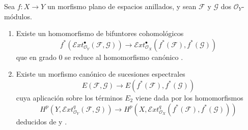 \begin{proposition}[12.3.4]
\label{0.12.3.4}
\label{0.12.3.4-fr}
Sea $f:X\to Y$ un morfismo \textup{plano} de espacios anillados, y sean
$\mathcal F$ y $\mathcal G$ dos $\mathcal O_Y$-módulos.
\begin{enumerate}
  \item[\rm(i)] Existe un homomorfismo de bifuntores cohomológicos
  \[
\label{0.12.3.4.1-fr}
\tag{12.3.4.1}
f^*(\mathcal{E}xt_{\mathcal O_Y}^{\bullet}(\mathcal F,\mathcal G))
\longrightarrow
\mathcal{E}xt_{\mathcal O_X}^{\bullet}(f^*(\mathcal F),f^*(\mathcal G))
\]
  que en grado $0$ se reduce al homomorfismo canónico
  .

  \item[\rm(ii)] Existe un morfismo canónico de sucesiones espectrales
  \[
\label{0.12.3.4.2-fr}
\tag{12.3.4.2}
E(\mathcal F,\mathcal G)\longrightarrow
E(f^*(\mathcal F),f^*(\mathcal G))
\]
  cuya aplicación sobre los términos $E_2$ viene dada por los homomorfismos
  \[
\label{0.12.3.4.3-fr}
\tag{12.3.4.3}
H^p(Y,\mathcal{E}xt_{\mathcal O_Y}^q(\mathcal F,\mathcal G))
\longrightarrow
H^p(X,\mathcal{E}xt_{\mathcal O_X}^q(f^*(\mathcal F),f^*(\mathcal G)))
\]
  deducidos de  y .
\end{enumerate}
\end{proposition}

